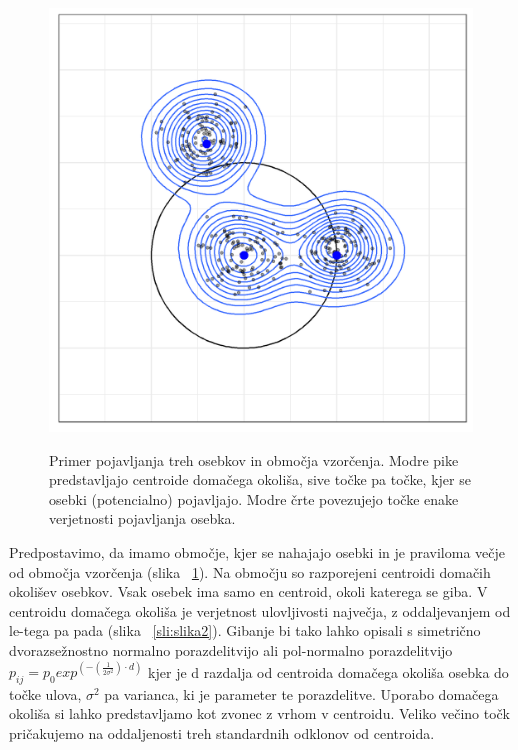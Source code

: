 \begin{figure}[htb]
 \begin{center}
 \scalebox{1.2} %
 {\includegraphics*[width=0.5\linewidth]{../r_koda_slike/figures/kernels_hr.png}}
 \end{center}
 \caption[Vzorčene točke in območje vzorčenja]{Primer pojavljanja treh osebkov in območja vzorčenja. Modre pike predstavljajo centroide domačega okoliša, sive točke pa točke, kjer se osebki (potencialno) pojavljajo. Modre črte povezujejo točke enake verjetnosti pojavljanja osebka.}
 \label{sli:slika1}
\end{figure}

Predpostavimo, da imamo območje, kjer se nahajajo osebki in je praviloma večje od območja vzorčenja (slika ~\ref{sli:slika1}). Na območju so razporejeni centroidi domačih okolišev osebkov. Vsak osebek ima samo en centroid, okoli katerega se giba. V centroidu domačega okoliša je verjetnost ulovljivosti največja, z oddaljevanjem od le-tega pa pada (slika ~\ref{sli:slika2}). Gibanje bi tako lahko opisali s simetrično dvorazsežnostno normalno porazdelitvijo ali pol-normalno porazdelitvijo $p_{ij} = p_0 exp^{(-(\frac{1}{2 \sigma^2}) \cdot d)}$ \citep[stran~127]{royle_spatial_2013} kjer je d razdalja od centroida domačega okoliša osebka do točke ulova, $\sigma^2$ pa varianca, ki je parameter te porazdelitve. Uporabo domačega okoliša si lahko predstavljamo kot zvonec z vrhom v centroidu. Veliko večino točk pričakujemo na oddaljenosti treh standardnih odklonov od centroida.

